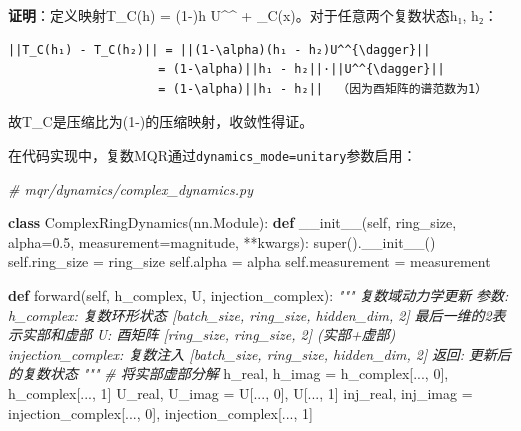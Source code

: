 \documentclass[
  12pt,
]{article}
\newenvironment{Shaded}{}{}
\newcommand{\BuiltInTok}[1]{#1}
\newcommand{\CommentTok}[1]{\textcolor[rgb]{0.38,0.63,0.69}{\textit{#1}}}
\newcommand{\DecValTok}[1]{\textcolor[rgb]{0.25,0.63,0.44}{#1}}
\newcommand{\FloatTok}[1]{\textcolor[rgb]{0.25,0.63,0.44}{#1}}
\newcommand{\FunctionTok}[1]{\textcolor[rgb]{0.02,0.16,0.49}{#1}}
\newcommand{\KeywordTok}[1]{\textcolor[rgb]{0.00,0.44,0.13}{\textbf{#1}}}
\newcommand{\NormalTok}[1]{#1}
\newcommand{\OperatorTok}[1]{\textcolor[rgb]{0.40,0.40,0.40}{#1}}
\newcommand{\StringTok}[1]{\textcolor[rgb]{0.25,0.44,0.63}{#1}}
\newcommand{\VariableTok}[1]{\textcolor[rgb]{0.10,0.09,0.49}{#1}}
\begin{document}
\textbf{证明}：定义映射T\_C(h) = (1-\alpha)h U\^{}^{\dagger} +
\alphaJ\_C(x)。对于任意两个复数状态h₁, h₂：

\begin{verbatim}
||T_C(h₁) - T_C(h₂)|| = ||(1-\alpha)(h₁ - h₂)U^^{\dagger}||
                     = (1-\alpha)||h₁ - h₂||·||U^^{\dagger}||
                     = (1-\alpha)||h₁ - h₂||  （因为酉矩阵的谱范数为1）
\end{verbatim}

故T\_C是压缩比为(1-\alpha)的压缩映射，收敛性得证。

在代码实现中，复数MQR通过\texttt{dynamics\_mode=\textquotesingle{}unitary\textquotesingle{}}参数启用：

\begin{Shaded}
\begin{Highlighting}[]
\CommentTok{\# mqr/dynamics/complex\_dynamics.py}

\KeywordTok{class}\NormalTok{ ComplexRingDynamics(nn.Module):}
    \KeywordTok{def} \FunctionTok{\_\_init\_\_}\NormalTok{(}\VariableTok{self}\NormalTok{, ring\_size, alpha}\OperatorTok{=}\FloatTok{0.5}\NormalTok{, measurement}\OperatorTok{=}\StringTok{\textquotesingle{}magnitude\textquotesingle{}}\NormalTok{, }\OperatorTok{**}\NormalTok{kwargs):}
        \BuiltInTok{super}\NormalTok{().}\FunctionTok{\_\_init\_\_}\NormalTok{()}
        \VariableTok{self}\NormalTok{.ring\_size }\OperatorTok{=}\NormalTok{ ring\_size}
        \VariableTok{self}\NormalTok{.alpha }\OperatorTok{=}\NormalTok{ alpha}
        \VariableTok{self}\NormalTok{.measurement }\OperatorTok{=}\NormalTok{ measurement}
        
    \KeywordTok{def}\NormalTok{ forward(}\VariableTok{self}\NormalTok{, h\_complex, U, injection\_complex):}
        \CommentTok{"""}
\CommentTok{        复数域动力学更新}
\CommentTok{        }
\CommentTok{        参数:}
\CommentTok{            h\_complex: 复数环形状态 [batch\_size, ring\_size, hidden\_dim, 2]}
\CommentTok{                      最后一维的2表示实部和虚部}
\CommentTok{            U: 酉矩阵 [ring\_size, ring\_size, 2] (实部+虚部)}
\CommentTok{            injection\_complex: 复数注入 [batch\_size, ring\_size, hidden\_dim, 2]}
\CommentTok{        }
\CommentTok{        返回:}
\CommentTok{            更新后的复数状态}
\CommentTok{        """}
        \CommentTok{\# 将实部虚部分解}
\NormalTok{        h\_real, h\_imag }\OperatorTok{=}\NormalTok{ h\_complex[..., }\DecValTok{0}\NormalTok{], h\_complex[..., }\DecValTok{1}\NormalTok{]}
\NormalTok{        U\_real, U\_imag }\OperatorTok{=}\NormalTok{ U[..., }\DecValTok{0}\NormalTok{], U[..., }\DecValTok{1}\NormalTok{]}
\NormalTok{        inj\_real, inj\_imag }\OperatorTok{=}\NormalTok{ injection\_complex[..., }\DecValTok{0}\NormalTok{], injection\_complex[..., }\DecValTok{1}\NormalTok{]}
        

\end{Highlighting}
\end{Shaded}
\end{document}
